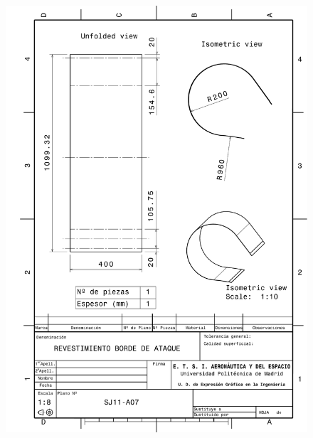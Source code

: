 \begin{figure}
    \centering
    \includegraphics[width=\linewidth]{Figures//Planos/RBA.pdf}
\end{figure}

